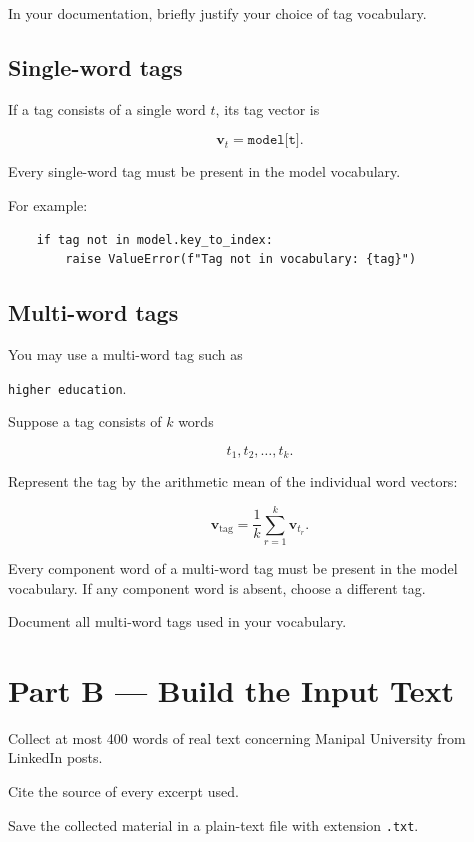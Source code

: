 \documentclass[12pt]{article}
\begin{document}
In your documentation, briefly justify your choice of tag vocabulary.

\subsection*{Single-word tags}

If a tag consists of a single word \(t\), its tag vector is

\[
\mathbf{v}_t = \texttt{model[t]}.
\]

Every single-word tag must be present in the model vocabulary.

For example:

\begin{lstlisting}
    if tag not in model.key_to_index:
        raise ValueError(f"Tag not in vocabulary: {tag}")
\end{lstlisting}

\subsection*{Multi-word tags}

You may use a multi-word tag such as

\begin{center}
\texttt{higher education}.
\end{center}

Suppose a tag consists of \(k\) words

\[
t_1,t_2,\ldots,t_k.
\]

Represent the tag by the arithmetic mean of the individual word
vectors:

\[
\mathbf{v}_{\mathrm{tag}}
=
\frac{1}{k}
\sum_{r=1}^{k}
\mathbf{v}_{t_r}.
\]

Every component word of a multi-word tag must be present in the model
vocabulary. If any component word is absent, choose a different tag.

Document all multi-word tags used in your vocabulary.

\section*{Part B --- Build the Input Text}

Collect at most 400 words of real text concerning Manipal University
from LinkedIn posts.

Cite the source of every excerpt used.

Save the collected material in a plain-text file with extension
\texttt{.txt}.
\end{document}

